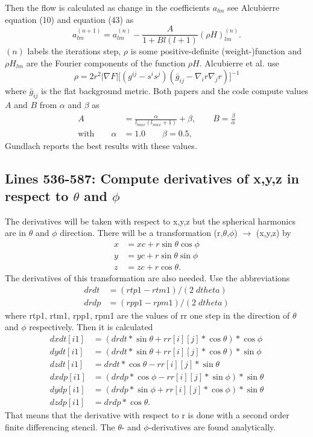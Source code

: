 \documentclass[11pt,a4paper,twoside]{article}
\begin{document}
Then the flow is calculated as change in the coefficients $a_{lm}$ 
see Alcubierre \cite{Alcubierre:1998rq} equation (10) and \cite{Gundlach:1997us}
equation (43) as
\begin{equation}
  a_{lm}^{(n+1)} = a_{lm}^{(n)} - \frac A {1 + Bl(l+1)} (\rho H)^{(n)}_{lm}.
\end{equation}
$(n)$ labels the iterations step, $\rho$ is some positive-definite (weight-)function
and $\rho H_{lm}$ are the Fourier components of the function $\rho H$.
Alcubierre et al. use
\begin{equation} 
  \rho = 2 r^2 |\nabla F| \Big[ ( g^{ij} -s^i s^j)(\bar g_{ij} 
         - \nabla_i r \nabla_j r)\Big]^{-1}
\end{equation} 
where $\bar g_{ij}$ is the flat background metric.
Both papers and the code compute values $A$ and $B$ from $\alpha$ and $\beta$ as
\begin{align}
  \label{defAB}
  A&= \frac {\alpha} {l_{max}(l_{max}+1)} + \beta, \qquad
   B= \frac {\beta} {\alpha}\\
 \text{with}\qquad \alpha &=1.0 \qquad \beta=0.5,
\end{align}
Gundlach reports the best results with these values.


\subsection{Lines 536-587: Compute derivatives of x,y,z in respect 
to $\theta$ and $\phi$}
The derivatives will be taken with respect to x,y,z but the 
spherical harmonics are in
$\theta$ and $\phi$ direction. There will be a transformation 
(r,$\theta$,$\phi$) $\rightarrow$ (x,y,z) by
\begin{align}
  x&=xc + r \sin \theta \cos \phi\\
  y&=yc + r \sin \theta \sin \phi\\
  z&=zc + r \cos \theta.
\end{align}
The derivatives of this transformation are also needed. Use the abbreviations
\begin{align}
  drdt &= (rtp1-rtm1)/(2 \;dtheta)\\
  drdp &= (rpp1-rpm1)/(2 \;dtheta)
\end{align}
where rtp1, rtm1, rpp1, rpm1 are the values of rr one step in the direction of $\theta$ and $\phi$
respectively. Then it is calculated
\begin{align}
  dxdt[i1] &= (drdt*\sin\theta + rr[i][j]*\cos\theta)*\cos\phi \\
  dydt[i1] &= (drdt*\sin\theta + rr[i][j]*\cos\theta)*\sin\phi \\
  dzdt[i1] &=  drdt*\cos\theta - rr[i][j]*\sin\theta \\
  dxdp[i1] &= (drdp*\cos\phi   - rr[i][j]*\sin\phi)*\sin\theta \\
  dydp[i1] &= (drdp*\sin\phi   + rr[i][j]*\cos\phi)*\sin\theta \\
  dzdp[i1] &=  drdp*\cos\theta.
\end{align}
That means that the derivative with respect to r is done with a 
second order finite differencing stencil. The $\theta$- and 
$\phi$-derivatives are found analytically.
\end{document}
